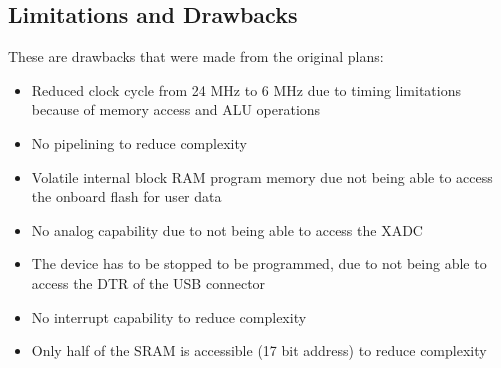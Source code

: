 \subsection{Limitations and Drawbacks}
These are drawbacks that were made from the original plans:
\begin{itemize}
    \item Reduced clock cycle from 24 MHz to 6 MHz due to timing limitations because of memory access and ALU operations
    \item No pipelining to reduce complexity
    \item Volatile internal block RAM program memory due not being able to access the onboard flash for user data
    \item No analog capability due to not being able to access the XADC
    \item The device has to be stopped to be programmed, due to not being able to access the DTR of the USB connector
    \item No interrupt capability to reduce complexity
    \item Only half of the SRAM is accessible (17 bit address) to reduce complexity
\end{itemize}

\newpage

